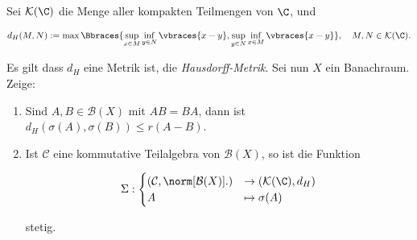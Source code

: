 \begin{exercise}[22/2$^\ast$]

Sei $\mathcal{K}(\C)$ die Menge aller kompakten Teilmengen von $\C$, und

\begin{align*}
  d_H(M, N)
  :=
  \max \Bbraces
  {
    \sup_{x \in M} \inf_{y \in N} \vbraces{x - y},
    \sup_{y \in N} \inf_{x \in M} \vbraces{x - y}
  },
  \quad
  M, N \in \mathcal{K}(\C).
\end{align*}

Es gilt dass $d_H$ eine Metrik ist, die \textit{Hausdorff-Metrik}.
Sei nun $X$ ein Banachraum.
Zeige:

\begin{enumerate}[label = (\alph*)]

  \item
  Sind $A, B \in \mathcal{B}(X)$ mit $A B = B A$, dann ist $d_H(\sigma(A), \sigma(B)) \leq r(A - B)$.

  \item
  Ist $\mathcal{C}$ eine kommutative Teilalgebra von $\mathcal{B}(X)$, so ist die Funktion

  \begin{align*}
    \Sigma:
    \begin{cases}
      (\mathcal{C}, \norm[\mathcal{B}(X)]{.}) & \to (\mathcal{K}(\C), d_H) \\
      A & \mapsto \sigma(A)
    \end{cases}
  \end{align*}

  stetig.

\end{enumerate}

\end{exercise}

